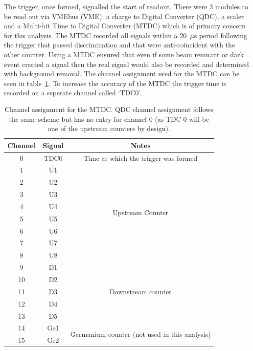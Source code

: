 The trigger, once formed, signalled the start of readout. There were 3 modules to be read out via VMEbus (VME): a charge to Digital Converter (QDC), a scaler and a Multi-hit Time to Digital Converter (MTDC) which is of primary concern for this analysis. The MTDC recorded all signals  within a 20~\(\mu\)s period following the trigger that passed discrimination and that were anti-coincident with the other counter. Using a MTDC ensured that even if some beam remnant or dark event created a signal then the real signal would also be recorded and determined with background removal. The channel assignment used for the MTDC can be seen in table~\ref{tab:mtdc_ch}. To increase the accuracy of the MTDC the trigger time is recorded on a seperate channel called `TDC0'.
\begin{table}
    \begin{center}
    \begin{tabular}{c|c|c}
        Channel & Signal & Notes\\
        \hline
        0  & TDC0 & Time at which the trigger was formed \\
        \hline
        1  & U1   & \multirow{8}{*}{Upstream Counter}\\
        2  & U2   & \\
        3  & U3   & \\
        4  & U4   & \\
        5  & U5   & \\
        6  & U6   & \\
        7  & U7   & \\
        8  & U8   & \\
        \hline
        9  & D1   & \multirow{5}{*}{Downstream counter}\\
        10 & D2   & \\
        11 & D3   & \\
        12 & D4   & \\
        13 & D5   & \\
        \hline
        14 & Ge1  & \multirow{2}{*}{Germanium counter (not used in this analysis)}\\
        15 & Ge2  & \\
    \end{tabular}
    \end{center}
    \caption{Channel assignment for the MTDC. QDC channel assignment follows the same scheme but has no entry for channel 0 (as TDC 0 will be one of the upstream counters by design).}
    \label{tab:mtdc_ch}
\end{table}

